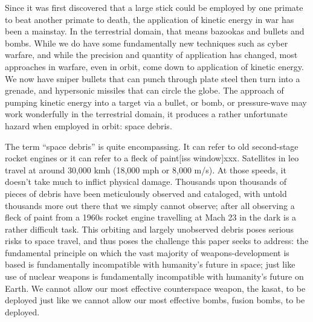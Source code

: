 {}

\titlenote{}

\maketitle

\pagestyle{theRest}
\thispagestyle{firstPage}

Since it was first discovered that a large stick could be employed by
one primate to beat another primate to death, the application of
kinetic energy in war has been a mainstay.  In the terrestrial domain,
that means bazookas and bullets and bombs.  While we do have some
fundamentally new techniques such as cyber warfare\cite{big-risks},
and while the precision and quantity of application has changed, most
approaches in warfare, even in orbit, come down to application of
kinetic energy.\cite{brian} We now have sniper bullets that can punch
through plate steel then turn into a grenade\cite[fancy sniper
  bullets]{xxx}, and hypersonic missiles that can circle the
globe.\cite[chinese hypersonic]{xxx}  The approach of pumping kinetic
energy into a target via a bullet, or bomb, or pressure-wave may work
wonderfully in the terrestrial domain, it produces a rather
unfortunate hazard when employed in orbit: space debris.

The term ``space debris'' is quite encompassing.  It can refer to old
second-stage rocket engines\cite[just about anything]{xxx} or it can
refer to a fleck of paint[iss window]{xxx}.  Satellites in \ac{leo}
travel at around 30,000 kmh (18,000 mph or 8,000
m/s).\cite[hyperphysics]{xxx} At those speeds, it doesn't take much to
inflict physical damage.  Thousands upon thousands of pieces of debris
have been meticulously observed and cataloged, with untold thousands
more out there that we simply cannot observe; after all observing a
fleck of paint from a 1960s rocket engine travelling at Mach 23 in the
dark is a rather difficult task.  This orbiting and largely unobserved
debris poses serious risks to space travel, and thus poses the
challenge this paper seeks to address: the fundamental principle on
which the vast majority of weapons-development is based is
fundamentally incompatible with humanity's future in space; just like
use of nuclear weapons is fundamentally incompatible with humanity's
future on Earth.  We cannot allow our most effective counterspace
weapon, the \acf{kasat}, to be deployed just like we cannot allow our
most effective bombs, fusion bombs, to be deployed.

